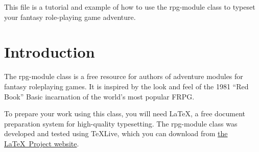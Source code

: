 \documentclass[a4paper,serif]{rpg-module}
\begin{document}


\maketitle



%

\showtitle

This file is a tutorial and example of how to use the rpg-module class to typeset your fantasy role-playing game adventure.

\part{Introduction}

The rpg-module class is a free resource for authors of adventure modules for fantasy roleplaying games.
It is inspired by the look and feel of the 1981 ``Red Book'' Basic incarnation of the world's most popular FRPG.

To prepare your work using this class, you will need \LaTeX, a free document preparation system for high-quality
typesetting. The rpg-module class was developed and tested using \TeX Live, which you can download from
\href{https://latex-project.org/ftp.html}{the \LaTeX~Project website}.
\end{document}
